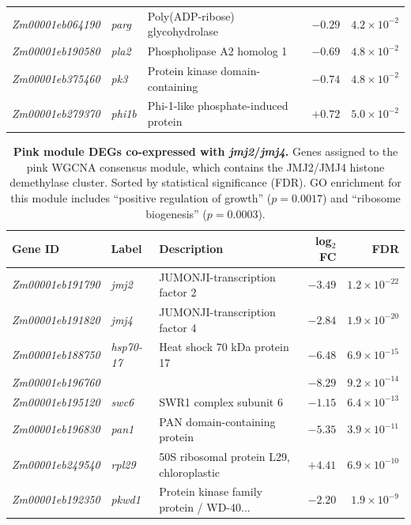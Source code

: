 \documentclass[9pt,twocolumn,twoside]{rilabRxiv}
\newcommand{\jmjii}{\textit{jmj2}\xspace}
\newcommand{\jmjiv}{\textit{jmj4}\xspace}
\begin{document}
\begin{table}[!ht]
\begin{tabular}{@{}lllrr@{}}
\textit{Zm00001eb064190} & \textit{parg} & Poly(ADP-ribose) glycohydrolase & $-0.29$ & $4.2 \times 10^{-2}$ \\
\textit{Zm00001eb190580} & \textit{pla2} & Phospholipase A2 homolog 1 & $-0.69$ & $4.8 \times 10^{-2}$ \\
\textit{Zm00001eb375460} & \textit{pk3} & Protein kinase domain-containing & $-0.74$ & $4.8 \times 10^{-2}$ \\
\textit{Zm00001eb279370} & \textit{phi1b} & Phi-1-like phosphate-induced protein & $+0.72$ & $5.0 \times 10^{-2}$ \\
\bottomrule
\end{tabular}
\end{table}


\begin{table}[!ht]
\caption{\textbf{Pink module DEGs co-expressed with \jmjii/\jmjiv.} Genes assigned to the pink WGCNA consensus module, which contains the JMJ2/JMJ4 histone demethylase cluster. Sorted by statistical significance (FDR). GO enrichment for this module includes ``positive regulation of growth'' ($p = 0.0017$) and ``ribosome biogenesis'' ($p = 0.0003$).}
\label{tab::pink_module}
\centering
\small
\begin{tabular}{@{}lllrr@{}}
\toprule
\textbf{Gene ID} & \textbf{Label} & \textbf{Description} & \textbf{log$_2$FC} & \textbf{FDR} \\
\midrule
\textit{Zm00001eb191790} & \textit{jmj2} & JUMONJI-transcription factor 2 & $-3.49$ & $1.2 \times 10^{-22}$ \\
\textit{Zm00001eb191820} & \textit{jmj4} & JUMONJI-transcription factor 4 & $-2.84$ & $1.9 \times 10^{-20}$ \\
\textit{Zm00001eb188750} & \textit{hsp70-17} & Heat shock 70 kDa protein 17 & $-6.48$ & $6.9 \times 10^{-15}$ \\
\textit{Zm00001eb196760} &  &  & $-8.29$ & $9.2 \times 10^{-14}$ \\
\textit{Zm00001eb195120} & \textit{swc6} & SWR1 complex subunit 6 & $-1.15$ & $6.4 \times 10^{-13}$ \\
\textit{Zm00001eb196830} & \textit{pan1} & PAN domain-containing protein & $-5.35$ & $3.9 \times 10^{-11}$ \\
\textit{Zm00001eb249540} & \textit{rpl29} & 50S ribosomal protein L29, chloroplastic & $+4.41$ & $6.9 \times 10^{-10}$ \\
\textit{Zm00001eb192350} & \textit{pkwd1} & Protein kinase family protein / WD-40... & $-2.20$ & $1.9 \times 10^{-9}$ \\

\end{tabular}
\end{table}
\end{document}
